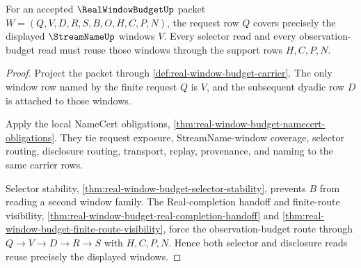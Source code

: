 \begin{theorem}
\label{thm:real-window-budget-window-coverage-obligation}
For an accepted $\RealWindowBudgetUp$ packet $W=(Q,V,D,R,S,B,O,H,C,P,N)$, the request row $Q$ covers precisely the displayed $\StreamNameUp$ windows $V$. Every selector read and every observation-budget read must reuse those windows through the support rows $H,C,P,N$.
\end{theorem}
\begin{proof}
Project the packet through \autoref{def:real-window-budget-carrier}. The only window row named by the finite request $Q$ is $V$, and the subsequent dyadic row $D$ is attached to those windows.

Apply the local NameCert obligations, \autoref{thm:real-window-budget-namecert-obligations}. They tie request exposure, StreamName-window coverage, selector routing, disclosure routing, transport, replay, provenance, and naming to the same carrier rows.

Selector stability, \autoref{thm:real-window-budget-selector-stability}, prevents $B$ from reading a second window family. The Real-completion handoff and finite-route visibility, \autoref{thm:real-window-budget-real-completion-handoff} and \autoref{thm:real-window-budget-finite-route-visibility}, force the observation-budget route through $Q \to V \to D \to R \to S$ with $H,C,P,N$. Hence both selector and disclosure reads reuse precisely the displayed windows.
\end{proof}

